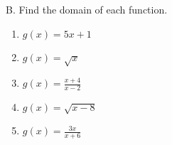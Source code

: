 B. Find the domain of each function.
\begin{enumerate}[label = \arabic*. ]
\item \hspce ${g(x)  = 5x+1 }$ 
\vspce 
\item \hspce ${g(x)  =  \sqrt{x} }$ 
\vspce 
\item \hspce ${ g(x) = \displaystyle  \frac{x+4}{x-2} }$ 
\vspce 
\item \hspce ${ g(x)  =  \sqrt{ x-8}}$ 
\vspce 
\item \hspce ${g(x)  =  \displaystyle  \frac{3x}{x+6}}$ 
\end{enumerate}  